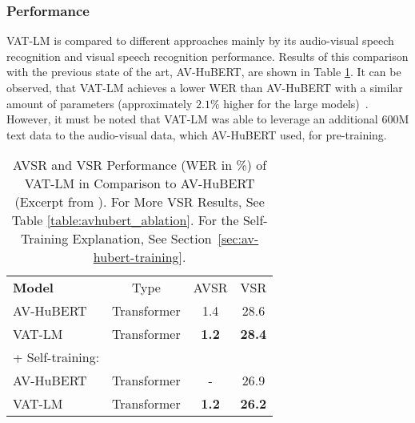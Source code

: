 \subsubsection{Performance}
VAT-LM is compared to different approaches mainly by its audio-visual speech recognition and visual speech recognition performance. Results of this comparison with the previous state of the art, AV-HuBERT, are shown in Table \ref{table:vatlm_performance}. It can be observed, that VAT-LM achieves a lower WER than AV-HuBERT with a similar amount of parameters (approximately $2.1\%$ higher for the large models)~\cite{vatlm}. However, it must be noted that VAT-LM was able to leverage an additional 600M text data to the audio-visual data, which AV-HuBERT used, for pre-training.

\begin{table}[h]
        \centering
        \begin{tabular}{l c c c}
        \hline
        \textbf{Model} & Type & AVSR & VSR\\
        AV-HuBERT&Transformer&1.4&28.6\\
        VAT-LM &Transformer&\textbf{1.2}&\textbf{28.4}\\
        \hline
        + Self-training:&&&\\
        AV-HuBERT&Transformer&-&26.9\\
        VAT-LM&Transformer&\textbf{1.2}&\textbf{26.2}\\
        \hline
        \end{tabular}
    \caption{\label{table:vatlm_performance}AVSR and VSR Performance (WER in \%) of VAT-LM in Comparison to AV-HuBERT (Excerpt from \citealt{vatlm}). For More VSR Results, See Table \ref{table:avhubert_ablation}. For the Self-Training Explanation, See Section~\ref{sec:av-hubert-training}.}
\end{table}